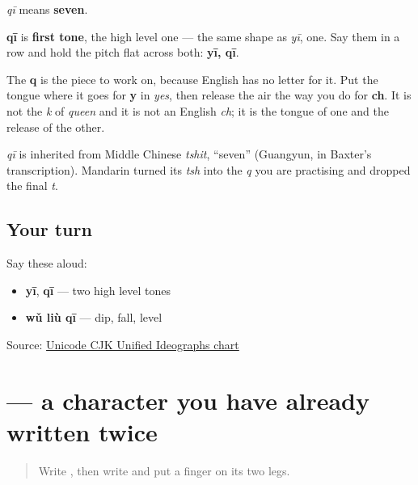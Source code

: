 \begin{sounds}
\textbf{} \emph{qī} means \textbf{seven}.

\textbf{qī} is \textbf{first tone}, the high level one — the same shape as \emph{yī}, one. Say them in a row and hold the pitch flat across both: \textbf{yī, qī}.

The \textbf{q} is the piece to work on, because English has no letter for it. Put the tongue where it goes for \textbf{y} in \emph{yes}, then release the air the way you do for \textbf{ch}. It is not the \emph{k} of \emph{queen} and it is not an English \emph{ch}; it is the tongue of one and the release of the other.
\end{sounds}

\begin{cousinweb}
\textbf{} \emph{qī} is inherited from Middle Chinese \emph{tshit}, \textquotedblleft{}seven\textquotedblright{} (Guangyun, in Baxter's transcription). Mandarin turned its \emph{tsh} into the \emph{q} you are practising and dropped the final \emph{t}.
\end{cousinweb}

\subsection*{Your turn}
Say these aloud:

\begin{itemize}
\raggedright
  \item \textbf{yī}, \textbf{qī} — two high level tones
  \item \textbf{wǔ liù qī} — dip, fall, level
\end{itemize}

\begin{tcolorbox}[breakable,colback=teal!4,colframe=teal!35!black,title={Before you move on}]
Source: \href{https://www.unicode.org/charts/PDF/U4E00.pdf}{Unicode CJK Unified Ideographs chart}
\end{tcolorbox}
\section[\texorpdfstring{\zh{八} (bā)}{八 (bā)}]{ — a character you have already written twice}

\label{lesson:ZH-W20-ba}



\begin{quote}
Write , then write  and put a finger on its two legs.
\end{quote}

